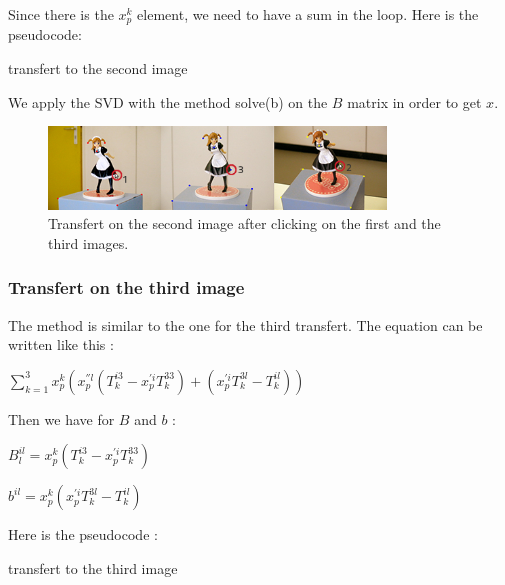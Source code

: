 \documentclass{report}
\begin{document}
Since there is the $x_{p}^{k}$ element, we need to have a sum in the loop. Here is the pseudocode:

\begin{algorithm}
\SetLine
\caption{transfert to the second image}
\SetLine
{}
\end{algorithm}
We apply the SVD with the method solve(b) on the $B$ matrix in order to get $x$. 
\begin{figure}[ht]
   \begin{center}
	\includegraphics[width=0.8\textwidth]{Tenseur.png}
	\caption{Transfert on the second image after clicking on the first and the third images.}
	\label{fig:mon image}
	\end{center}
\end{figure}

\subsubsection{Transfert on the third image}
The method is similar to the one for the third transfert.
The equation can be written like this : 

\begin{center}
 $ \displaystyle { \sum_{k = 1}^{3}} x_{p}^{k}(x_{p}^{''l}(T_{k}^{i3} - x_{p}^{'i}T_{k}^{33}) + ( x_{p}^{'i}T_{k}^{3l} - T_{k}^{il}))$ 
\end{center}

Then we have for $B$ and $b$ :  
\begin{center}
$B_{l}^{il} = x_{p}^{k}(T_{k}^{i3} - x_{p}^{'i}T_{k}^{33})$
\end{center}
\begin{center}
$b^{il} = x_{p}^{k}(x_{p}^{'i}T_{k}^{3l} - T_{k}^{il})$
\end{center}

Here is the pseudocode : 
\begin{algorithm}
\SetLine
\caption{transfert to the third image}
\SetLine
{}
\end{algorithm}
\end{document}
